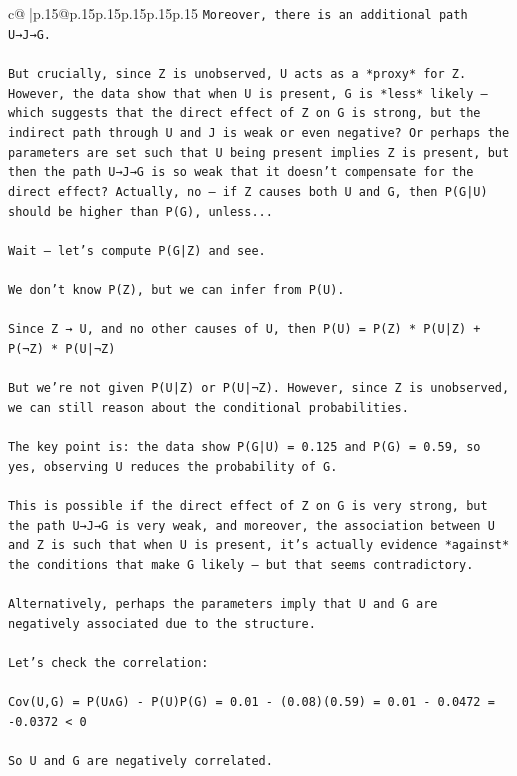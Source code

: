 \documentclass{article}
\begin{document}
{\begin{supertabular}{c@{$\;$}|p{.15\linewidth}@{}p{.15\linewidth}p{.15\linewidth}p{.15\linewidth}p{.15\linewidth}p{.15\linewidth}}
{{{\texttt{Moreover, there is an additional path U→J→G.} \\
\\ 
\texttt{But crucially, since Z is unobserved, U acts as a *proxy* for Z. However, the data show that when U is present, G is *less* likely — which suggests that the direct effect of Z on G is strong, but the indirect path through U and J is weak or even negative? Or perhaps the parameters are set such that U being present implies Z is present, but then the path U→J→G is so weak that it doesn’t compensate for the direct effect? Actually, no — if Z causes both U and G, then P(G|U) should be higher than P(G), unless...} \\
\\ 
\texttt{Wait — let’s compute P(G|Z) and see.} \\
\\ 
\texttt{We don’t know P(Z), but we can infer from P(U).} \\
\\ 
\texttt{Since Z → U, and no other causes of U, then P(U) = P(Z) * P(U|Z) + P(¬Z) * P(U|¬Z)} \\
\\ 
\texttt{But we’re not given P(U|Z) or P(U|¬Z). However, since Z is unobserved, we can still reason about the conditional probabilities.} \\
\\ 
\texttt{The key point is: the data show P(G|U) = 0.125 and P(G) = 0.59, so yes, observing U reduces the probability of G.} \\
\\ 
\texttt{This is possible if the direct effect of Z on G is very strong, but the path U→J→G is very weak, and moreover, the association between U and Z is such that when U is present, it’s actually evidence *against* the conditions that make G likely — but that seems contradictory.} \\
\\ 
\texttt{Alternatively, perhaps the parameters imply that U and G are negatively associated due to the structure.} \\
\\ 
\texttt{Let’s check the correlation:} \\
\\ 
\texttt{Cov(U,G) = P(U∧G) {-} P(U)P(G) = 0.01 {-} (0.08)(0.59) = 0.01 {-} 0.0472 = {-}0.0372 < 0} \\
\\ 
\texttt{So U and G are negatively correlated.} \\
}}}
\end{supertabular}}
\end{document}
